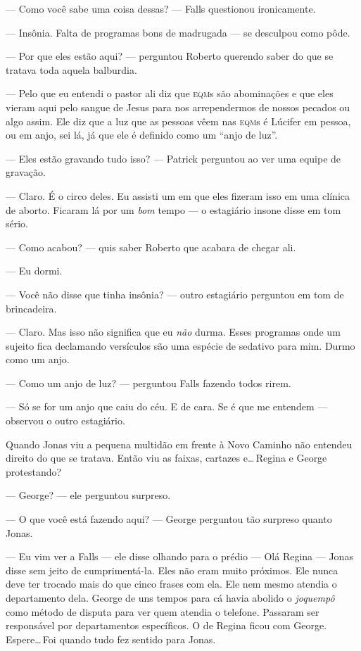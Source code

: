 --- Como você sabe uma coisa dessas? --- Falls questionou ironicamente.

--- Insônia. Falta de programas bons de madrugada --- se desculpou como pôde.

--- Por que eles estão aqui? --- perguntou Roberto\mudanca{,} querendo saber do que se tratava toda aquela balburdia.

--- Pelo que eu entendi o pastor ali diz que \textsc{eqm}s são abominações\mudanca{,} e que eles vieram aqui pelo sangue de Jesus para nos arrependermos de nossos pecados\mudanca{,} ou algo assim. Ele diz que a luz que as pessoas vêem nas \textsc{eqm}s é Lúcifer em pessoa, ou em anjo, sei lá, já que ele é definido como um ``anjo de luz''.

--- Eles estão gravando tudo isso? --- Patrick perguntou ao ver uma equipe de gravação.

--- Claro. É o circo deles. Eu assisti um em que eles fizeram isso em uma clínica de aborto. Ficaram lá por um \emph{bom} tempo --- o estagiário insone disse em tom sério.

--- Como acabou? --- quis saber Roberto que acabara de chegar ali.

--- Eu dormi.

--- Você não disse que tinha insônia? --- outro estagiário perguntou\mudanca{,} em tom de brincadeira.

--- Claro. Mas isso não significa que eu \emph{não} durma. Esses programas onde um sujeito fica declamando versículos são uma espécie de sedativo para mim. Durmo como um anjo.

--- Como um anjo de luz? --- perguntou Falls\mudanca{,} fazendo todos rirem.

--- Só se for um anjo que caiu do céu. E de cara. Se é que me entendem --- observou o outro estagiário.

Quando Jonas viu a pequena multidão em frente à Novo Caminho\mudanca{,} não entendeu direito do que se tratava. Então viu as faixas, cartazes e\ldots\,Regina e George protestando?

--- George? --- ele perguntou\mudanca{,} surpreso.

--- O que você está fazendo aqui? --- George perguntou tão surpreso quanto Jonas.

--- Eu vim ver a Falls --- ele disse\mudanca{,} olhando para o prédio --- Olá\mudanca{,} Regina --- Jonas disse\mudanca{,} sem jeito de cumprimentá-la. Eles não eram muito próximos. Ele nunca deve ter trocado mais do que cinco frases com ela. Ele nem mesmo atendia o departamento dela. George\mudanca{,} de uns tempos para cá\mudanca{,} havia abolido o \emph{joquempô} como método de disputa para ver quem atendia o telefone. Passaram  ser responsável por departamentos específicos. O de Regina ficou com George. Espere\ldots\,Foi quando tudo fez sentido para Jonas.

